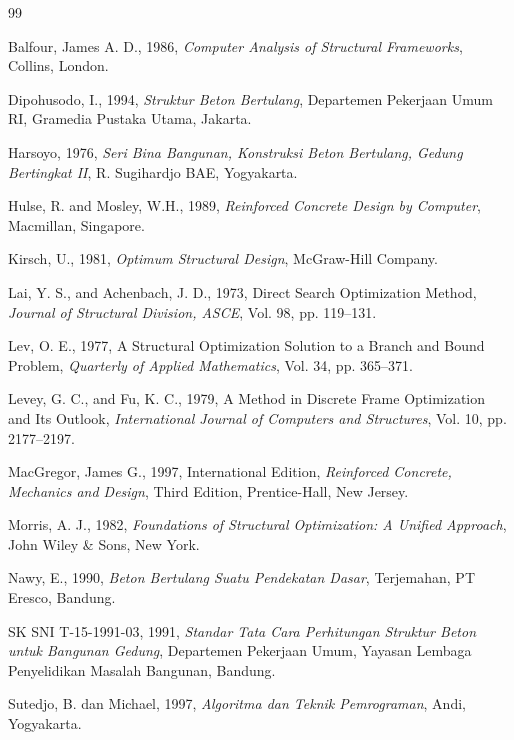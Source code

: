 \begin{thebibliography}{99}

 Balfour, James A. D., 1986, \textit{Computer Analysis of Structural Frameworks}, Collins, London.

 Dipohusodo, I., 1994, \textit{Struktur Beton Bertulang}, Departemen Pekerjaan Umum RI, Gramedia Pustaka Utama, Jakarta.

 Harsoyo, 1976, \textit{Seri Bina Bangunan, Konstruksi Beton Bertulang, Gedung Bertingkat II}, R. Sugihardjo BAE, Yogyakarta.

 Hulse, R. and Mosley, W.H., 1989, \textit{Reinforced Concrete Design by Computer}, Macmillan, Singapore.

 Kirsch, U., 1981, \textit{Optimum Structural Design}, McGraw-Hill Company.

 Lai, Y. S., and Achenbach, J. D., 1973, Direct Search Optimization Method, \textit{Journal of Structural Division, ASCE}, Vol. 98, pp. 119--131.

 Lev, O. E., 1977, A Structural Optimization Solution to a Branch and Bound Problem, \textit{Quarterly of Applied Mathematics}, Vol. 34, pp. 365--371.

 Levey, G. C., and Fu, K. C., 1979, A Method in Discrete Frame Optimization and Its Outlook, \textit{International Journal of Computers and Structures}, Vol. 10, pp. 2177--2197.

 MacGregor, James G., 1997, International Edition, \textit{Reinforced Concrete, Mechanics and Design}, Third Edition, Prentice-Hall, New Jersey.

 Morris, A. J., 1982, \textit{Foundations of Structural Optimization: A Unified Approach}, John Wiley \& Sons, New York.

 Nawy, E., 1990, \textit{Beton Bertulang Suatu Pendekatan Dasar}, Terjemahan, PT Eresco, Bandung.

 SK SNI T-15-1991-03, 1991, \textit{Standar Tata Cara Perhitungan Struktur Beton untuk Bangunan Gedung}, Departemen Pekerjaan Umum, Yayasan Lembaga Penyelidikan Masalah Bangunan, Bandung.

 Sutedjo, B. dan Michael, 1997, \textit{Algoritma dan Teknik Pemrograman}, Andi, Yogyakarta.


\end{thebibliography}
